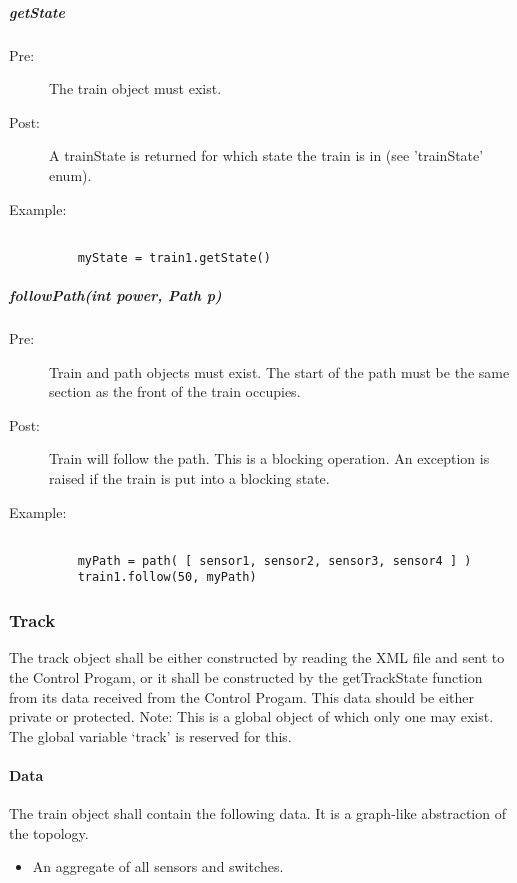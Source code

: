 \documentclass[a4paper,11pt,notitlepage]{article}
\def\CS{Control Progam\xspace}
\begin{document}
\subparagraph{getState}
\begin{description}
\item[\hspace{1cm}Pre:] The train object must exist.
\item[\hspace{1cm}Post:] A trainState is returned for which state the train is in (see 'trainState' enum).
\item[\hspace{1cm}Example:]
\begin{verbatim}

    myState = train1.getState()
\end{verbatim}
\end{description}

\subparagraph{followPath(int power, Path p)}
\begin{description}
\item[\hspace{1cm}Pre:] Train and path objects must exist. The start of the path must be the same section as the front of the train occupies.
\item[\hspace{1cm}Post:] Train will follow the path. This is a blocking operation. An exception is raised if the train is put into a blocking state.
\item[\hspace{1cm}Example:]
\begin{verbatim}

    myPath = path( [ sensor1, sensor2, sensor3, sensor4 ] )
    train1.follow(50, myPath)
\end{verbatim}
\end{description}

\subsubsection{Track}
The track object shall be either constructed by reading the XML file and sent to the \CS, or it shall be constructed by the getTrackState function from its data received from the \CS. This data should be either private or protected.
Note: This is a global object of which only one may exist. The global variable `track' is reserved for this.
\paragraph{Data}
The train object shall contain the following data. It is a graph-like abstraction of the topology.
\begin{itemize}
\item An aggregate of all sensors and switches.
\end{itemize}
\end{document}
